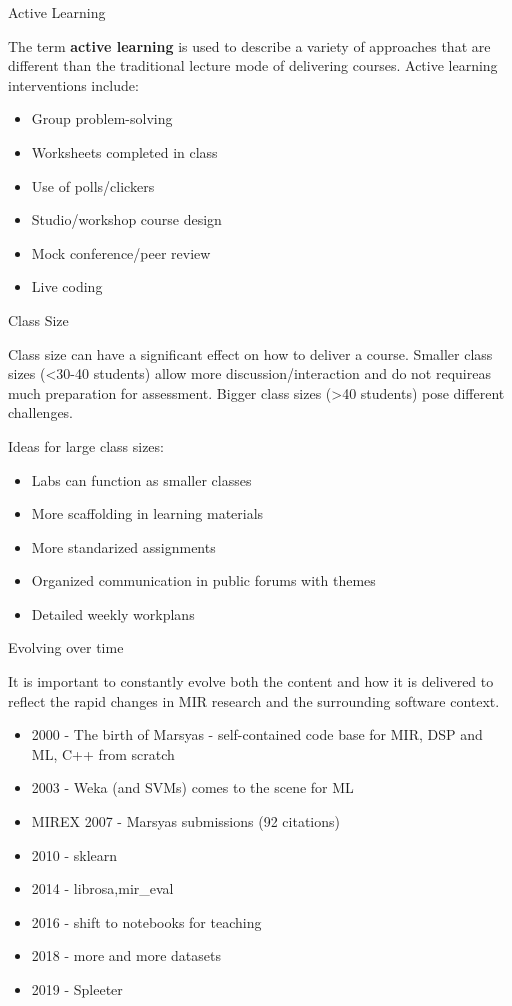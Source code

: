 \documentclass[12pt]{beamer}
\begin{document}
\begin{frame}{Active Learning}

  The term {\bf active learning} is used to describe a variety of
  approaches that are different than the traditional lecture mode
  of delivering courses. Active learning interventions include:

  \begin{itemize}
  \item{Group problem-solving}
  \item{Worksheets completed in class}
  \item{Use of polls/clickers}
  \item{Studio/workshop course design}
  \item{Mock conference/peer review}
  \item{Live coding} 
  \end{itemize} 
\end{frame} 

\begin{frame}{Class Size}

  Class size can have a significant effect on how to deliver a
  course. Smaller class sizes (<30-40 students) allow more
  discussion/interaction and do not requireas much preparation for
  assessment. Bigger class sizes (>40 students) pose different challenges.
  
  Ideas for large class sizes:
  \begin{itemize}
  \item{Labs can function as smaller classes}
  \item{More scaffolding in learning materials}
  \item{More standarized assignments}
  \item{Organized communication in public forums with themes}
  \item{Detailed weekly workplans}
  \end{itemize} 
\end{frame} 


\begin{frame}{Evolving over time}

  It is important to constantly evolve both the content and how it is
  delivered to reflect the rapid changes in MIR research and the surrounding
  software context. 

  \begin{itemize}
  \item{2000 - The birth of Marsyas - self-contained code base for MIR, DSP and ML, C++ from scratch}
    \item{2003 - Weka (and SVMs) comes to the scene for ML} 
    \item{MIREX 2007 - Marsyas submissions (92 citations)}
    \item{2010 - sklearn}
    \item{2014 - librosa,mir\_eval}
    \item{2016 - shift to notebooks for teaching}
    \item{2018 - more and more datasets}
    \item{2019 - Spleeter} 
  \end{itemize} 
\end{frame}
\end{document}
